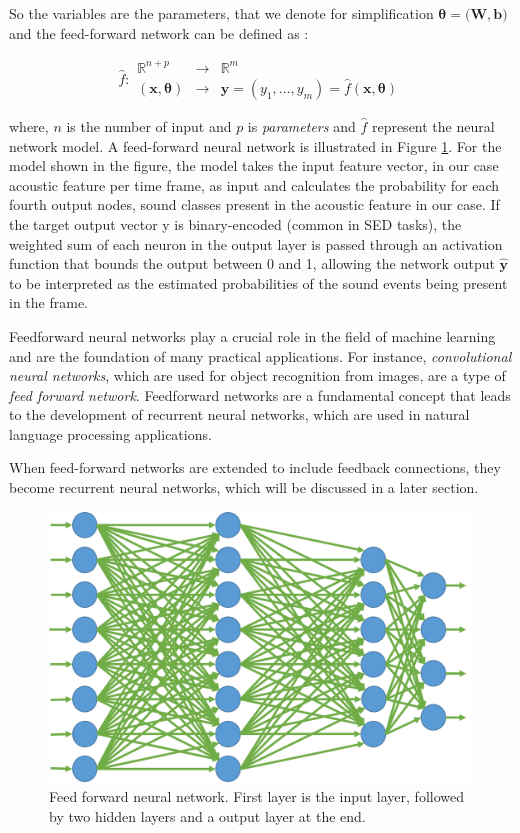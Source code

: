 So the variables are the parameters, that we denote for simplification $\boldsymbol{\theta}=\boldsymbol{(W},\boldsymbol{b)}$ and the feed-forward network can be defined as :

\[
\widehat{f}:\begin{array}{ccc}
\mathbb{R^{\mathit{n+p}}} & \rightarrow & \mathbb{R^{\mathit{m}}}\\
(\boldsymbol{x},\boldsymbol{\theta}) & \rightarrow & \boldsymbol{y}=(y_{1},...,y_{m})=\widehat{f}(\boldsymbol{x},\boldsymbol{\theta})
\end{array}
\]


where, $n$ is the number of input and $p$ is \textit{parameters} and $\widehat{f}$ represent the neural network model. A feed-forward neural network is illustrated in Figure \ref{fig:DNN}. For the model shown in the figure, the model takes the input feature vector, in our case acoustic feature per time frame, as input and calculates the probability for each fourth output nodes, sound classes present in the acoustic feature in our case. If the target output vector y is binary-encoded (common in SED tasks), the weighted sum of each neuron in the output layer is passed through an activation function that bounds the output between 0 and 1, allowing the network output $\boldsymbol{\hat{y}}$ to be
interpreted as the estimated probabilities of the sound events being present in the frame.

Feedforward neural networks play a crucial role in the field of machine learning and are the foundation of many practical applications. For instance, \textit{convolutional neural networks}, which are used for object recognition from images, are a type of \textit{feed forward network}. Feedforward networks are a fundamental concept that leads to the development of recurrent neural networks, which are used in natural language processing applications.

When feed-forward networks are extended to include feedback connections, they become recurrent neural networks, which will be discussed in a later section.


\begin{figure}[htbp]
   \begin{center}
      \includegraphics[width=0.8\linewidth]{Chapitre1/figures/DNN.png}
   \end{center}
   \caption{Feed forward neural network. First layer is the input layer, followed by two hidden layers and a output layer at the end.}
   \label{fig:DNN}
\end{figure}



